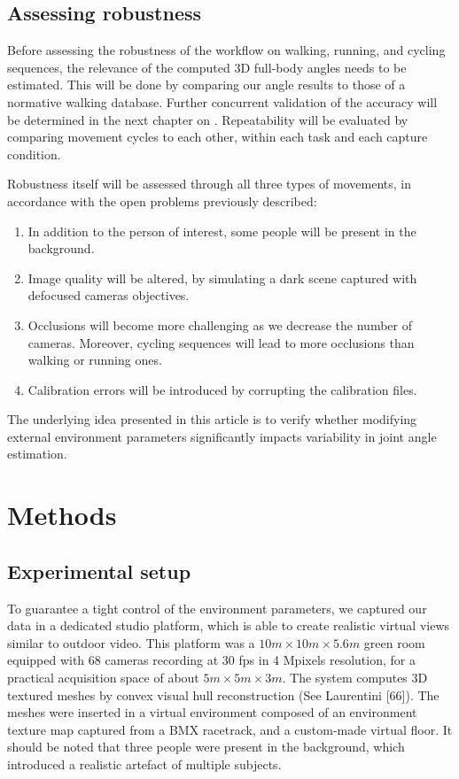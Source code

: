 \subsection{Assessing robustness}

Before assessing the robustness of the workflow on walking, running, and cycling sequences, the relevance of the computed 3D full-body angles needs to be estimated. This will be done by comparing our angle results to those of a normative walking database. Further concurrent validation of the accuracy will be determined in the next chapter on . Repeatability will be evaluated by comparing movement cycles to each other, within each task and each capture condition. 

Robustness itself will be assessed through all three types of movements, in accordance with the open problems previously described:
\begin{enumerate}[itemsep=0em, topsep=0em, leftmargin=*]
      \item In addition to the person of interest, some people will be present in the background. 
      \item Image quality will be altered, by simulating a dark scene captured with defocused cameras objectives.
      \item Occlusions will become more challenging as we decrease the number of cameras. Moreover, cycling sequences will lead to more occlusions than walking or running ones.
      \item Calibration errors will be introduced by corrupting the calibration files.
\end{enumerate}

The underlying idea presented in this article is to verify whether modifying external environment parameters significantly impacts variability in joint angle estimation.


\section{Methods}
\subsection{Experimental setup}

To guarantee a tight control of the environment parameters, we captured our data in a dedicated studio platform, which is able to create realistic virtual views similar to outdoor video. This platform was a \(10 m \times 10 m \times 5.6 m\) green room equipped with 68 cameras recording at 30 fps in 4 Mpixels resolution, for a practical acquisition space of about \(5 m  \times 5 m  \times 3 m\). The system computes 3D textured meshes by convex visual hull reconstruction (See Laurentini [66]). The meshes were inserted in a virtual environment composed of an environment texture map captured from a BMX racetrack, and a custom-made virtual floor. It should be noted that three people were present in the background, which introduced a realistic artefact of multiple subjects.

